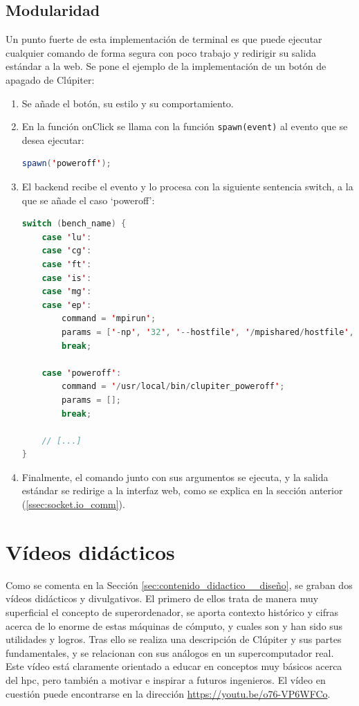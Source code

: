 \subsection{Modularidad}
Un punto fuerte de esta implementación de terminal es que puede ejecutar cualquier comando de forma segura con poco trabajo y redirigir su salida estándar a la web. Se pone el ejemplo de la implementación de un botón de apagado de Clúpiter:

\begin{enumerate}
  \item Se añade el botón, su estilo y su comportamiento.
  \item En la función onClick se llama con la función \texttt{spawn(event)} al evento que se desea ejecutar:
\begin{lstlisting}[language=java]
spawn('poweroff');
\end{lstlisting}
  \item El backend recibe el evento y lo procesa con la siguiente sentencia switch, a la que se añade el caso `poweroff':
\begin{lstlisting}[language=java]
switch (bench_name) {
    case 'lu':
    case 'cg':
    case 'ft':
    case 'is':
    case 'mg':
    case 'ep':
        command = 'mpirun';
        params = ['-np', '32', '--hostfile', '/mpishared/hostfile', '--mca', 'opal_warn_on_missing_libcuda', '0', `/mpishared/NPB3.4.2/NPB3.4-MPI/bin/${bench_name}.*.x`];
        break;

    case 'poweroff':
        command = '/usr/local/bin/clupiter_poweroff';
        params = [];
        break;
    
    // [...]
}
\end{lstlisting}
  \item Finalmente, el comando junto con sus argumentos se ejecuta, y la salida estándar se redirige a la interfaz web, como se explica en la sección anterior (\ref{ssec:socket.io_comm}).
\end{enumerate}

\section{Vídeos didácticos}
\label{sec:videos_didacticos}
Como se comenta en la Sección \ref{sec:contenido_didactico__diseño}, se graban dos vídeos didácticos y divulgativos. El primero de ellos trata de manera muy superficial el concepto de superordenador, se aporta contexto histórico y cifras acerca de lo enorme de estas máquinas de cómputo, y cuales son y han sido sus utilidades y logros. Tras ello se realiza una descripción de Clúpiter y sus partes fundamentales, y se relacionan con sus análogos en un supercomputador real. Este vídeo está claramente orientado a educar en conceptos muy básicos acerca del \acrshort{hpc}, pero también a motivar e inspirar a futuros ingenieros. El vídeo en cuestión puede encontrarse en la dirección \url{https://youtu.be/o76-VP6WFCo}.

